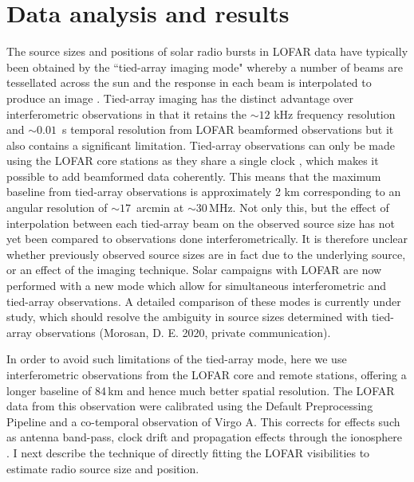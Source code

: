 \section{Data analysis and results} \label{sec:data}
The source sizes and positions of solar radio bursts in LOFAR data have typically been obtained by the ``tied-array imaging mode" \citep{Morosan2014} whereby a number of beams are tessellated across the sun and the response in each beam is interpolated to produce an image \citep[e.g.][]{Reid2017,Kontar2017,Zucca2018, Morosan2019}. Tied-array imaging has the distinct advantage over interferometric observations in that it retains the ${\sim} 12$ kHz frequency resolution and ${\sim} 0.01$~s temporal resolution from LOFAR beamformed observations but it also contains a significant limitation. Tied-array observations can only be made using the LOFAR core stations as they share a single clock \citep{DeGasperin2019}, which makes it possible to add beamformed data coherently. This means that the maximum baseline from tied-array observations is approximately 2 km corresponding to an angular resolution of ${\sim} 17$~arcmin at ${\sim} 30$\,MHz. Not only this, but the effect of interpolation between each tied-array beam on the observed source size has not yet been compared to observations done interferometrically. It is therefore unclear whether previously observed source sizes are in fact due to the underlying source, or an effect of the imaging technique. Solar campaigns with LOFAR are now performed with a new mode which allow for simultaneous interferometric and tied-array observations. A detailed comparison of these modes is currently under study, which should resolve the ambiguity in source sizes determined with tied-array observations (Morosan, D. E. 2020, private communication). 

In order to avoid such limitations of the tied-array mode, here we use interferometric observations from the LOFAR core and remote stations, offering a longer baseline of 84\,km and hence much better spatial resolution.
The LOFAR data from this observation were calibrated using the Default Preprocessing Pipeline \cite[DPPP;][]{VanDiepen2018} and a co-temporal observation of Virgo A. This corrects for effects such as antenna band-pass, clock drift and propagation effects through the ionosphere \citep{DeGasperin2019}. I next describe the technique of directly fitting the LOFAR visibilities to estimate radio source size and position.

